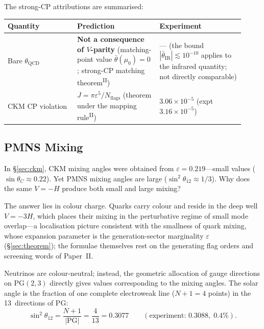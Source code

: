 \documentclass[12pt,a4paper]{article}
\newcommand{\PII}{\textsuperscript{\textup{II}}}
\begin{document}
The strong-CP attributions are summarised:
\medskip
\begin{center}\footnotesize
\begin{tabular}{@{}p{0.27\linewidth}p{0.32\linewidth}p{0.33\linewidth}@{}}
\toprule
Quantity & Prediction & Experiment \\
\midrule
Bare $\theta_\mathrm{QCD}$ & \textbf{Not a consequence of $V$-parity} (matching-point value $\bar\theta(\mu_0)=0$; strong-CP matching theorem\PII{}) & --- (the bound $|\bar\theta_\mathrm{IR}| \lesssim 10^{-10}$ applies to the infrared quantity; not directly comparable) \\
CKM CP violation & $J = \pi\varepsilon^5/N_\mathrm{flags}$ (theorem under the mapping rule\PII{}) & $3.06 \times 10^{-5}$ (expt $3.16{\times}10^{-5}$) \\
\bottomrule
\end{tabular}
\end{center}
\bigskip

\subsection{PMNS Mixing}

In \S\ref{sec:ckm}, CKM mixing angles were obtained from
$\varepsilon = 0.219$---small values ($\sin\theta_C \approx 0.22$).
Yet PMNS mixing angles are large
($\sin^2\!\theta_{12} \approx 1/3$).
Why does the same $V = -H$ produce both small and large mixing?

The answer lies in colour charge. Quarks carry colour and reside in the deep well $V = -3H$, which places their mixing in the perturbative regime of small mode overlap---a localisation picture consistent with the smallness of quark mixing, whose expansion parameter is the generation-sector marginality $\varepsilon$ (\S\ref{sec:theorem}); the formulae themselves rest on the generating flag orders and screening words of Paper~II.

Neutrinos are colour-neutral; instead, the geometric allocation
of gauge directions on $\mathrm{PG}(2,3)$ directly gives values
corresponding to the mixing angles.
The solar angle is the fraction of one complete electroweak line
($N{+}1 = 4$ points) in the 13~directions of $\mathrm{PG}$:
\begin{equation}
  \sin^2\!\theta_{12} = \frac{N{+}1}{|\mathrm{PG}|}
  = \frac{4}{13} = 0.3077
  \qquad (\text{experiment: } 0.3088,\; 0.4\%).
\end{equation}
\end{document}
